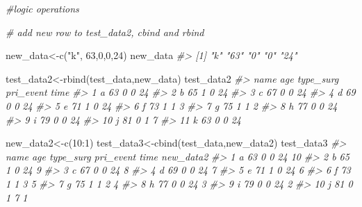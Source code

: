 \documentclass[
]{article}
\newenvironment{Shaded}{\begin{snugshade}}{\end{snugshade}}
\newcommand{\CommentTok}[1]{\textcolor[rgb]{0.56,0.35,0.01}{\textit{#1}}}
\newcommand{\DecValTok}[1]{\textcolor[rgb]{0.00,0.00,0.81}{#1}}
\newcommand{\FunctionTok}[1]{\textcolor[rgb]{0.00,0.00,0.00}{#1}}
\newcommand{\NormalTok}[1]{#1}
\newcommand{\OtherTok}[1]{\textcolor[rgb]{0.56,0.35,0.01}{#1}}
\newcommand{\SpecialCharTok}[1]{\textcolor[rgb]{0.00,0.00,0.00}{#1}}
\newcommand{\StringTok}[1]{\textcolor[rgb]{0.31,0.60,0.02}{#1}}
\begin{document}
\begin{Shaded}
\begin{Highlighting}[]
\CommentTok{\#logic operations}

\CommentTok{\# add new row to test\_data2, cbind and rbind}

\NormalTok{new\_data}\OtherTok{\textless{}{-}}\FunctionTok{c}\NormalTok{(}\StringTok{"k"}\NormalTok{, }\DecValTok{63}\NormalTok{,}\DecValTok{0}\NormalTok{,}\DecValTok{0}\NormalTok{,}\DecValTok{24}\NormalTok{)}
\NormalTok{new\_data}
\CommentTok{\#\textgreater{} [1] "k"  "63" "0"  "0"  "24"}

\NormalTok{test\_data2}\OtherTok{\textless{}{-}}\FunctionTok{rbind}\NormalTok{(test\_data,new\_data)}
\NormalTok{test\_data2}
\CommentTok{\#\textgreater{}    name age type\_surg pri\_event time}
\CommentTok{\#\textgreater{} 1     a  63         0         0   24}
\CommentTok{\#\textgreater{} 2     b  65         1         0   24}
\CommentTok{\#\textgreater{} 3     c  67         0         0   24}
\CommentTok{\#\textgreater{} 4     d  69         0         0   24}
\CommentTok{\#\textgreater{} 5     e  71         1         0   24}
\CommentTok{\#\textgreater{} 6     f  73         1         1    3}
\CommentTok{\#\textgreater{} 7     g  75         1         1    2}
\CommentTok{\#\textgreater{} 8     h  77         0         0   24}
\CommentTok{\#\textgreater{} 9     i  79         0         0   24}
\CommentTok{\#\textgreater{} 10    j  81         0         1    7}
\CommentTok{\#\textgreater{} 11    k  63         0         0   24}

\NormalTok{new\_data2}\OtherTok{\textless{}{-}}\FunctionTok{c}\NormalTok{(}\DecValTok{10}\SpecialCharTok{:}\DecValTok{1}\NormalTok{)}
\NormalTok{test\_data3}\OtherTok{\textless{}{-}}\FunctionTok{cbind}\NormalTok{(test\_data,new\_data2)}
\NormalTok{test\_data3}
\CommentTok{\#\textgreater{}    name age type\_surg pri\_event time new\_data2}
\CommentTok{\#\textgreater{} 1     a  63         0         0   24        10}
\CommentTok{\#\textgreater{} 2     b  65         1         0   24         9}
\CommentTok{\#\textgreater{} 3     c  67         0         0   24         8}
\CommentTok{\#\textgreater{} 4     d  69         0         0   24         7}
\CommentTok{\#\textgreater{} 5     e  71         1         0   24         6}
\CommentTok{\#\textgreater{} 6     f  73         1         1    3         5}
\CommentTok{\#\textgreater{} 7     g  75         1         1    2         4}
\CommentTok{\#\textgreater{} 8     h  77         0         0   24         3}
\CommentTok{\#\textgreater{} 9     i  79         0         0   24         2}
\CommentTok{\#\textgreater{} 10    j  81         0         1    7         1}


\end{Highlighting}
\end{Shaded}
\end{document}

